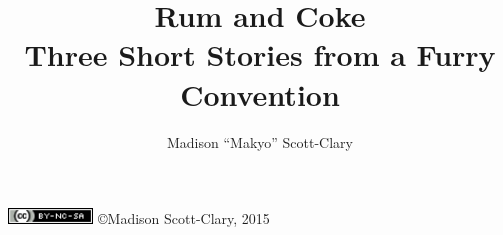 \documentclass[12pt,letterpaper,oneside]{memoir}
\title{\huge{Rum and Coke}\\\large{Three Short Stories from a Furry Convention}}
\author{Madison ``Makyo'' Scott-Clary}
\date{}
\begin{document}
  \frontmatter
  \maketitle
  
  \begin{center}
    \includegraphics[height=12pt]{by-nc-sa_inline} \copyright Madison Scott-Clary, 2015
  \end{center}

  \newpage
  \tableofcontents

  

  \mainmatter
  

  

  

  \backmatter
  
\end{document}
